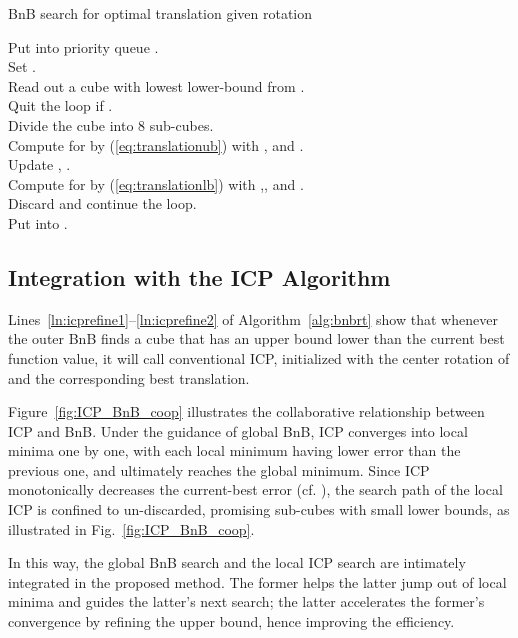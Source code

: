 \documentclass[10pt,journal,cspaper,compsoc]{IEEEtran}
\begin{document}
\begin{algorithm}[!tb]
\footnotesize
\caption{BnB search for optimal translation given rotation}\label{alg:bnbt}
    Put  into priority queue .\\
    Set .\\\label{ln:initalerror}
    \Begin
    {
        Read out a cube with lowest lower-bound  from .\\
        Quit the loop if . \\
        Divide the cube into 8 sub-cubes.\\
        {
            Compute  for  by (\ref{eq:translationub}) with , and .\\
            \If{}
            {
                Update , .\\
            }
            Compute  for  by (\ref{eq:translationlb}) with ,, and .\\
            \If{}
            {
                Discard  and continue the loop.\\
            }
            Put  into .
        }
    }
\end{algorithm}

\subsection{Integration with the ICP Algorithm}\label{sec:integration}
Lines~\ref{ln:icprefine1}--\ref{ln:icprefine2} of Algorithm~\ref{alg:bnbrt} show that whenever the outer BnB finds a cube  that has an upper bound lower than the current best function value, it will call conventional ICP, initialized with the center rotation of  and the corresponding best translation.

Figure~\ref{fig:ICP_BnB_coop} illustrates the collaborative relationship between ICP and BnB. Under the guidance of global BnB, ICP converges into local minima one by one, with each local minimum having lower error than the previous one, and ultimately reaches the global minimum.
Since ICP monotonically decreases the current-best error  (cf. \cite{besl1992method}), the search path of the local ICP is confined to un-discarded, promising sub-cubes with small lower bounds, as illustrated in Fig.~\ref{fig:ICP_BnB_coop}.

In this way, the global BnB search and the local ICP search are intimately integrated in the proposed method. The former helps the latter jump out of local minima and guides the latter's next search; the latter accelerates the former's convergence by refining the upper bound, hence improving the efficiency.
\end{document}
